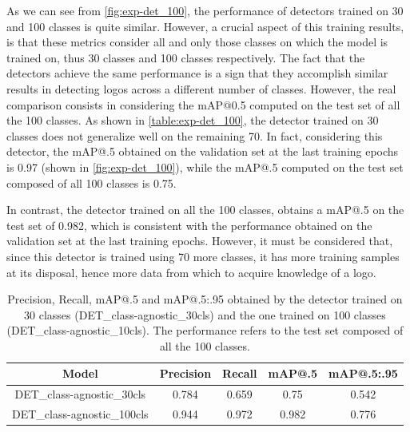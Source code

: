 As we can see from \autoref{fig:exp-det_100}, the performance of detectors trained on 30 and 100 classes is quite similar.
However, a crucial aspect of this training results, is that these metrics consider all and only those classes on which the model is trained on, thus 30 classes and 100 classes respectively.
The fact that the detectors achieve the same performance is a sign that they accomplish similar results in detecting logos across a different number of classes. However, the real comparison consists in considering the mAP@0.5 computed on the test set of all the 100 classes.
As shown in \autoref{table:exp-det_100}, the detector trained on 30 classes does not generalize well on the remaining 70.
In fact, considering this detector, the mAP@.5 obtained on the validation set at the last training epochs is 0.97 (shown in \autoref{fig:exp-det_100}), while the mAP@.5 computed on the test set composed of all 100 classes is 0.75.

In contrast, the detector trained on all the 100 classes, obtains a mAP@.5 on the test set of 0.982, which is consistent with the performance obtained on the validation set at the last training epochs.
However, it must be considered that, since this detector is trained using 70 more classes, it has more training samples at its disposal, hence more data from which to acquire knowledge of a logo.


\begin{table}[H]
    \centering
    \begin{tabular}{c|c|c|c|c}
        \hline
        \textbf{Model} &
        \textbf{Precision} &
        \textbf{Recall} &
        \textbf{mAP@.5} &
        \textbf{mAP@.5:.95} \\
        \hline
        \hline
DET\_class-agnostic\_30cls&0.784&0.659&0.75&0.542\\
DET\_class-agnostic\_100cls&0.944&0.972&0.982&0.776\\
\hline
\end{tabular}
\caption{Precision, Recall, mAP@.5 and mAP@.5:.95 obtained by the detector trained on 30 classes (DET\_class-agnostic\_30cls) and the one trained on 100 classes (DET\_class-agnostic\_10cls). The performance refers to the test set composed of all the 100 classes.}
    \label{table:exp-det_100}
\end{table}

